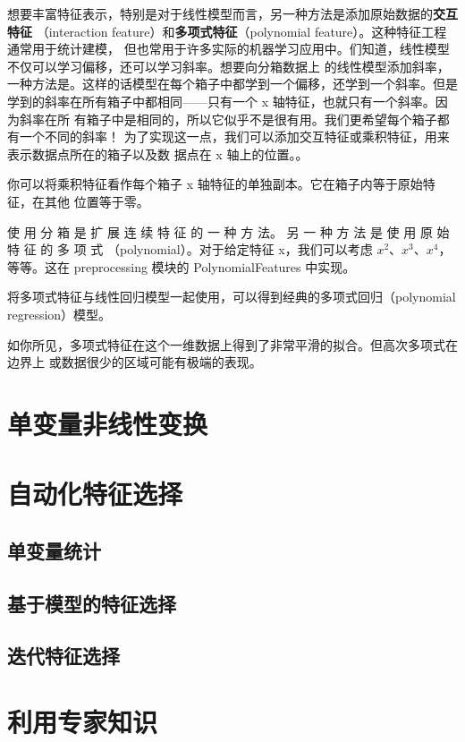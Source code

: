 想要丰富特征表示，特别是对于线性模型而言，另一种方法是添加原始数据的\textbf{交互特征}
（interaction feature）和\textbf{多项式特征}（polynomial feature）。这种特征工程通常用于统计建模，
但也常用于许多实际的机器学习应用中。们知道，线性模型不仅可以学习偏移，还可以学习斜率。想要向分箱数据上
的线性模型添加斜率，一种方法是。这样的话模型在每个箱子中都学到一个偏移，还学到一个斜率。但是学到的斜率在所有箱子中都相同——只有一个 x 轴特征，也就只有一个斜率。因为斜率在所
有箱子中是相同的，所以它似乎不是很有用。我们更希望每个箱子都有一个不同的斜率！
为了实现这一点，我们可以添加交互特征或乘积特征，用来表示数据点所在的箱子以及数
据点在 x 轴上的位置。。

你可以将乘积特征看作每个箱子 x 轴特征的单独副本。它在箱子内等于原始特征，在其他
位置等于零。

使 用 分 箱 是 扩 展 连 续 特 征 的 一 种 方 法。 另 一 种 方 法 是 使 用 原 始 特 征 的 多 项 式
（polynomial）。对于给定特征 x，我们可以考虑 $x^2$、$x^3$、$x^4$，等等。这在
preprocessing 模块的 PolynomialFeatures 中实现。

将多项式特征与线性回归模型一起使用，可以得到经典的多项式回归（polynomial
regression）模型。

如你所见，多项式特征在这个一维数据上得到了非常平滑的拟合。但高次多项式在边界上
或数据很少的区域可能有极端的表现。
\section{单变量非线性变换}
\section{自动化特征选择}
\subsection{单变量统计}
\subsection{基于模型的特征选择}
\subsection{迭代特征选择}
\section{利用专家知识}
